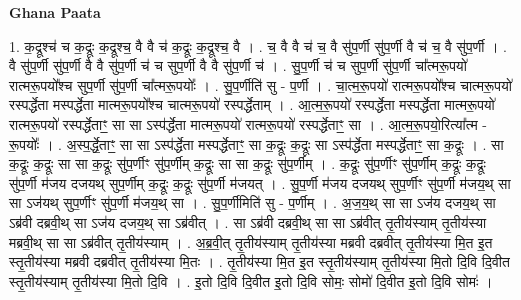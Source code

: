 \documentclass[17pt]{extarticle}
\begin{document}
\textbf{Ghana Paata } \newline

1. क॒द्रूश्च॑ च क॒द्रूः क॒द्रूश्च॒ वै वै च॑ क॒द्रूः क॒द्रूश्च॒ वै । . च॒ वै वै च॑ च॒ वै सु॑प॒र्णी सु॑प॒र्णी वै च॑ च॒ वै सु॑प॒र्णी । . वै सु॑प॒र्णी सु॑प॒र्णी वै वै सु॑प॒र्णी च॑ च सुप॒र्णी वै वै सु॑प॒र्णी च॑ । . सु॒प॒र्णी च॑ च सुप॒र्णी सु॑प॒र्णी चा᳚त्मरू॒पयो॑ रात्मरू॒पयो᳚श्च सुप॒र्णी सु॑प॒र्णी चा᳚त्मरू॒पयोः᳚ । . सु॒प॒र्णीति॑ सु - प॒र्णी । . चा॒त्म॒रू॒पयो॑ रात्मरू॒पयो᳚श्च चात्मरू॒पयो॑ रस्पर्द्धेता मस्पर्द्धेता मात्मरू॒पयो᳚श्च चात्मरू॒पयो॑ रस्पर्द्धेताम् । . आ॒त्म॒रू॒पयो॑ रस्पर्द्धेता मस्पर्द्धेता मात्मरू॒पयो॑ रात्मरू॒पयो॑ रस्पर्द्धेताꣳ॒॒ सा सा ऽस्प॑र्द्धेता मात्मरू॒पयो॑ रात्मरू॒पयो॑ रस्पर्द्धेताꣳ॒॒ सा । . आ॒त्म॒रू॒पयो॒रित्या᳚त्म - रू॒पयोः᳚ । . अ॒स्प॒र्द्धे॒ताꣳ॒॒ सा सा ऽस्प॑र्द्धेता मस्पर्द्धेताꣳ॒॒ सा क॒द्रूः क॒द्रूः सा ऽस्प॑र्द्धेता मस्पर्द्धेताꣳ॒॒ सा क॒द्रूः । . सा क॒द्रूः क॒द्रूः सा सा क॒द्रूः सु॑प॒र्णीꣳ सु॑प॒र्णीम् क॒द्रूः सा सा क॒द्रूः सु॑प॒र्णीम् । . क॒द्रूः सु॑प॒र्णीꣳ सु॑प॒र्णीम् क॒द्रूः क॒द्रूः सु॑प॒र्णी म॑जय दजयथ् सुप॒र्णीम् क॒द्रूः क॒द्रूः सु॑प॒र्णी म॑जयत् । . सु॒प॒र्णी म॑जय दजयथ् सुप॒र्णीꣳ सु॑प॒र्णी म॑जय॒थ् सा सा ऽज॑यथ् सुप॒र्णीꣳ सु॑प॒र्णी म॑जय॒थ् सा । . सु॒प॒र्णीमिति॑ सु - प॒र्णीम् । . अ॒ज॒य॒थ् सा सा ऽज॑य दजय॒थ् सा ऽब्र॑वी दब्रवी॒थ् सा ऽज॑य दजय॒थ् सा ऽब्र॑वीत् । . सा ऽब्र॑वी दब्रवी॒थ् सा सा ऽब्र॑वीत् तृ॒तीय॑स्याम् तृ॒तीय॑स्या मब्रवी॒थ् सा सा ऽब्र॑वीत् तृ॒तीय॑स्याम् । . अ॒ब्र॒वी॒त् तृ॒तीय॑स्याम् तृ॒तीय॑स्या मब्रवी दब्रवीत् तृ॒तीय॑स्या मि॒त इ॒त स्तृ॒तीय॑स्या मब्रवी दब्रवीत् तृ॒तीय॑स्या मि॒तः । . तृ॒तीय॑स्या मि॒त इ॒त स्तृ॒तीय॑स्याम् तृ॒तीय॑स्या मि॒तो दि॒वि दि॒वीत स्तृ॒तीय॑स्याम् तृ॒तीय॑स्या मि॒तो दि॒वि । . इ॒तो दि॒वि दि॒वीत इ॒तो दि॒वि सोमः॒ सोमो॑ दि॒वीत इ॒तो दि॒वि सोमः॑ । \newline
\end{document}
